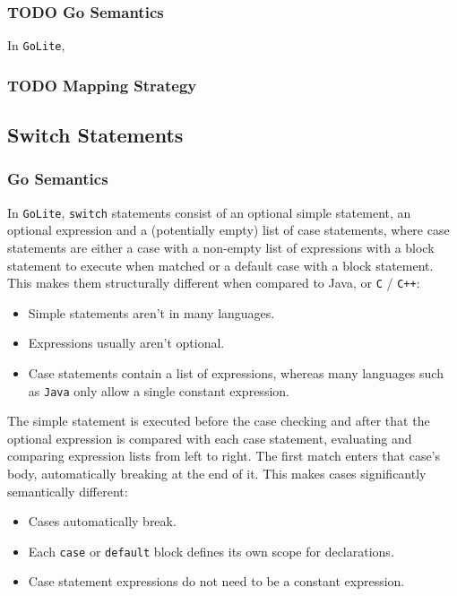 \documentclass[11pt]{article}
\begin{document}
\subsubsection{{\bfseries\sffamily TODO} Go Semantics}
\label{sec:org7bb293c}
In \texttt{GoLite},
\subsubsection{{\bfseries\sffamily TODO} Mapping Strategy}
\label{sec:org3d801cb}
\subsection{Switch Statements}
\label{sec:orgee60911}
\subsubsection{Go Semantics}
\label{sec:org376b187}
In \texttt{GoLite}, \texttt{switch} statements consist of an optional simple
statement, an optional expression and a (potentially empty) list
of case statements, where case statements are either a case with a
non-empty list of expressions with a block statement to execute
when matched or a default case with a block statement. This makes
them structurally different when compared to Java, or \texttt{C} / \texttt{C++}:
\begin{itemize}
\item Simple statements aren't in many languages.
\item Expressions usually aren't optional.
\item Case statements contain a list of expressions, whereas many
languages such as \texttt{Java} only allow a single constant expression.
\end{itemize}
The simple statement is executed before the case checking and
after that the optional expression is compared with each case
statement, evaluating and comparing expression lists from left to
right. The first match enters that case's body, automatically
breaking at the end of it. This makes cases significantly semantically different:
\begin{itemize}
\item Cases automatically break.
\item Each \texttt{case} or \texttt{default} block defines its own scope for declarations.
\item Case statement expressions do not need to be a constant expression.
\end{itemize}
\end{document}
